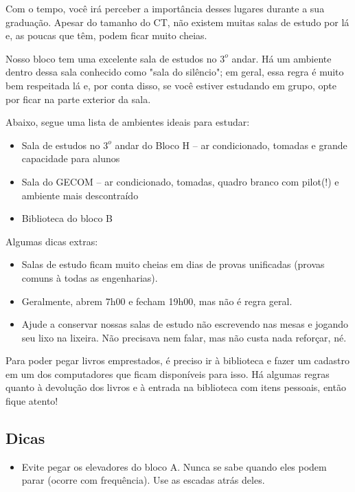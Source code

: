       Com o tempo, você irá perceber a importância desses lugares durante a sua graduação. Apesar do tamanho do CT, não existem muitas salas de estudo por lá e, as poucas que têm, podem ficar muito cheias. 

      Nosso bloco tem uma excelente sala de estudos no $3^o$ andar. Há um ambiente dentro dessa sala conhecido como "sala do silêncio"; em geral, essa regra é muito bem respeitada lá e, por conta disso, se você estiver estudando em grupo, opte por ficar na parte exterior da sala. 

      Abaixo, segue uma lista de ambientes ideais para estudar:
      \begin{itemize}
        \item Sala de estudos no $3^o$ andar do Bloco H -- ar condicionado, tomadas e grande capacidade para alunos
        \item Sala do GECOM -- ar condicionado, tomadas, quadro branco com pilot(!) e ambiente mais descontraído
        \item Biblioteca do bloco B  
      \end{itemize}
      Algumas dicas extras: 
      \begin{itemize}
        \item Salas de estudo ficam muito cheias em dias de provas unificadas (provas comuns à todas as engenharias).
        \item Geralmente, abrem 7h00 e fecham 19h00, mas não é regra geral.
        \item Ajude a conservar nossas salas de estudo não escrevendo nas mesas e jogando seu lixo na lixeira. Não precisava nem falar, mas não custa nada reforçar, né.
      \end{itemize}
      Para poder pegar livros emprestados, é preciso ir à biblioteca e fazer um cadastro em um dos computadores que ficam disponíveis para isso. Há algumas regras quanto à devolução dos livros e à entrada na biblioteca com itens pessoais, então fique atento!
      \subsection{Dicas}
      \begin{itemize}
      	\item Evite pegar os elevadores do bloco A. Nunca se sabe quando eles podem parar (ocorre com frequência). Use as escadas atrás deles.
      \end{itemize}